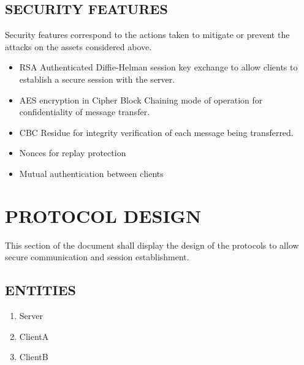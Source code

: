 \documentclass[twoside,letterpaper]{article}
\begin{document}
\bigskip
 
\subsection{SECURITY FEATURES}
Security features correspond to the actions taken to mitigate or prevent the attacks
on the assets considered above.

\begin{itemize}
\item RSA Authenticated Diffie-Helman session key exchange to allow clients to establish a secure session with the server.
\item AES encryption in Cipher Block Chaining mode of operation for confidentiality of message transfer.
\item CBC Residue for integrity verification of each message being transferred.
\item Nonces for replay protection
\item Mutual authentication between clients
\end{itemize} 

\bigskip 

\section{PROTOCOL DESIGN}
This section of the document shall display the design of the protocols to allow secure communication and
session establishment.
\subsection{ENTITIES}
\begin{enumerate}
\item Server
\item ClientA
\item ClientB
\end{enumerate}

\bigskip
\end{document}

